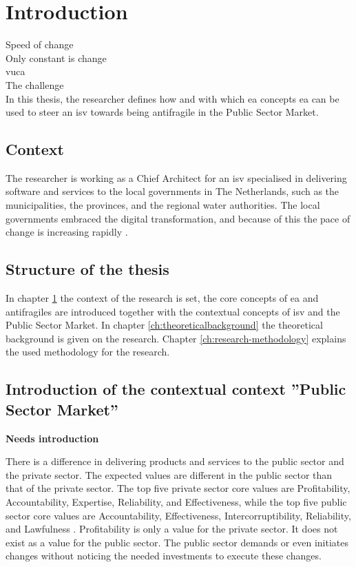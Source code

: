 \chapter{Introduction}
\label{ch:introduction}
Speed of change\\
Only constant is change\\

\acrfull{vuca}\\
The challenge\\

In this thesis, the researcher defines how and with which \acrfull{ea} concepts \acrshort{ea} can be used to steer an \acrfull{isv} towards being \gls{antifragile} in the Public Sector Market.

\section{Context}
\label{sec:context}
The researcher is working as a Chief Architect for an \acrshort{isv} specialised in delivering software and services to the local governments in The Netherlands, such as the municipalities, the provinces, and the regional water authorities. The local governments embraced the digital transformation, and because of this the pace of change is increasing rapidly \needsref. 

\section{Structure of the thesis}
\label{sec:structure}
In chapter \ref{ch:introduction} the context of the research is set, the core concepts of \acrshort{ea} and \glspl{antifragile} are introduced together with the contextual concepts of \acrshort{isv} and the Public Sector Market. In chapter \ref{ch:theoreticalbackground} the theoretical background is given on the research. Chapter \ref{ch:research-methodology} explains the used methodology for the research.

\section{Introduction of the contextual context ''Public Sector Market''}
\label{sec:intropublicsector}
\textbf{Needs introduction}\par
There is a difference in delivering products and services to the public sector and the private sector. The expected values are different in the public sector than that of the private sector. The top five private sector core values are  Profitability, Accountability, Expertise, Reliability, and Effectiveness, while the top five public sector core values are Accountability, Effectiveness, Intercorruptibility, Reliability, and Lawfulness \parencite{Wal2008}. Profitability is only a value for the private sector. It does not exist as a value for the public sector.  The public sector demands or even initiates changes without noticing the needed investments to execute these changes.

